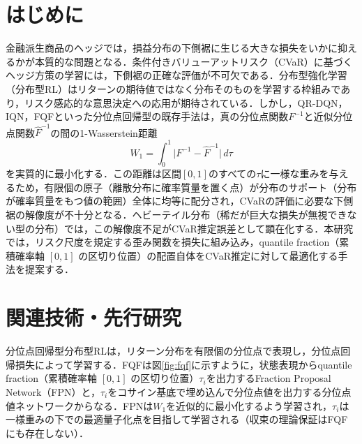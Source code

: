 \documentclass[a4paper,twocolumn,10pt]{jsarticle}
\begin{document}

\section{はじめに}
金融派生商品のヘッジでは，損益分布の下側裾に生じる大きな損失をいかに抑えるかが本質的な問題となる．条件付きバリューアットリスク（CVaR）に基づくヘッジ方策の学習には，下側裾の正確な評価が不可欠である．分布型強化学習（分布型RL）はリターンの期待値ではなく分布そのものを学習する枠組みであり，リスク感応的な意思決定への応用が期待されている．しかし，QR-DQN，IQN\cite{iqn}，FQF\cite{fqf}といった分位点回帰型の既存手法は，真の分位点関数$F^{-1}$と近似分位点関数$\hat F^{-1}$の間の1-Wasserstein距離
\begin{equation}
W_1=\int_0^1 \bigl|F^{-1}-\hat F^{-1}\bigr|\,d\tau
\end{equation}
を実質的に最小化する．この距離は区間$[0,1]$のすべての$\tau$に一様な重みを与えるため，有限個の原子（離散分布に確率質量を置く点）が分布のサポート（分布が確率質量をもつ値の範囲）全体に均等に配分され，CVaRの評価に必要な下側裾の解像度が不十分となる．ヘビーテイル分布（稀だが巨大な損失が無視できない型の分布）では，この解像度不足がCVaR推定誤差として顕在化する．本研究では，リスク尺度を規定する歪み関数を損失に組み込み，quantile fraction（累積確率軸 $[0, 1]$ の区切り位置）の配置自体をCVaR推定に対して最適化する手法を提案する．

\section{関連技術・先行研究}
分位点回帰型分布型RLは，リターン分布を有限個の分位点で表現し，分位点回帰損失によって学習する．FQF\cite{fqf}は図\ref{fig:fqf}に示すように，状態表現からquantile fraction（累積確率軸 $[0, 1]$ の区切り位置）$\tau_i$を出力するFraction Proposal Network（FPN）と，$\tau_i$をコサイン基底で埋め込んで分位点値を出力する分位点値ネットワークからなる．FPNは$W_1$を近似的に最小化するよう学習され，$\tau_i$は一様重みの下での最適量子化点を目指して学習される（収束の理論保証はFQFにも存在しない）．
\end{document}
